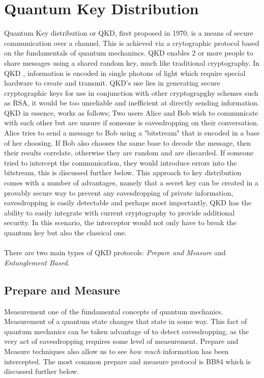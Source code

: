 \documentclass[journal]{IEEEtran}
\begin{document}
\section{Quantum Key Distribution}
Quantum Key distribution or QKD, first proposed in 1970, is a means of secure communication over a channel. This is achieved via a crytographic protocol based on the fundamentals of quantum mechanincs.
QKD enables 2 or more people to share messages using a shared random key, much like traditional cryptography. In QKD , information is encoded in single photons of light which require special hardware to create and transmit.
QKD's use lies in generating secure cryptographic keys for use in conjunction with other cryptograpghy schemes such as RSA, it would be too unreliable and inefficient at directly sending information.
QKD in essence, works as follows; Two users Alice and Bob wish to communicate with each other but are unsure if someone is eavesdropping on their conversation. Alice tries to send a message to Bob using a "bitstream" that is encoded in a base of 
her choosing. If Bob also chooses the same base to decode the message, then their results correlate, otherwise they are random and are discarded. If someone tried to intercept the communication, they would introduce errors into the bitstream, this is discussed further below.
This approach to key distribution comes with a number of advantages, namely that a secret key can be created in a provably secure way to prevent any eavesdropping of private information, eavesdropping is easily detectable and perhaps most importantly, QKD has the ability to 
easily integrate with current cryptography to provide additional security. In this scenario, the interceptor would not only have to break the quantum key but also the classical one. \\ \\
There are two main types of QKD protocols: \emph{Prepare and Measure} and \emph{Entanglement Based}.
\subsection{Prepare and Measure}
Measurement one of the fundamental concepts of quantum mechanics. Measurement of a quantum state changes that state in some way. This fact of quantum mechanics can be taken advantage of to detect eavesdropping,
as the very act of eavesdropping requires some level of measurement. Prepare and Measure techniques also allow us to see \emph{how much} information has been intercepted. The most common prepare and measure protocol is BB84 which is discussed further below.
\end{document}
